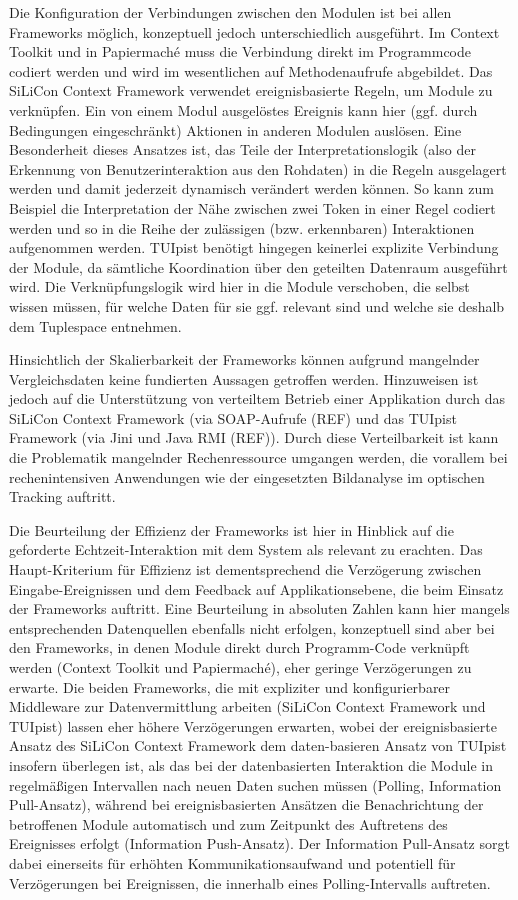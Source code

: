 Die Konfiguration der Verbindungen zwischen den Modulen ist bei allen Frameworks möglich, konzeptuell jedoch unterschiedlich ausgeführt. Im Context Toolkit und in Papiermaché muss die Verbindung direkt im Programmcode codiert werden und wird im wesentlichen auf Methodenaufrufe abgebildet. Das SiLiCon Context Framework verwendet ereignisbasierte Regeln, um Module zu verknüpfen. Ein von einem Modul ausgelöstes Ereignis kann hier (ggf. durch Bedingungen eingeschränkt) Aktionen in anderen Modulen auslösen. Eine Besonderheit dieses Ansatzes ist, das Teile der Interpretationslogik (also der Erkennung von Benutzerinteraktion aus den Rohdaten) in die Regeln ausgelagert werden und damit jederzeit dynamisch verändert werden können. So kann zum Beispiel die Interpretation der Nähe zwischen zwei Token in einer Regel codiert werden und so in die Reihe der zulässigen (bzw. erkennbaren) Interaktionen aufgenommen werden. TUIpist benötigt hingegen keinerlei explizite Verbindung der Module, da sämtliche Koordination über den geteilten Datenraum ausgeführt wird. Die Verknüpfungslogik wird hier in die Module verschoben, die selbst wissen müssen, für welche Daten für sie ggf. relevant sind und welche sie deshalb dem Tuplespace entnehmen.

Hinsichtlich der Skalierbarkeit der Frameworks können aufgrund mangelnder Vergleichsdaten keine fundierten Aussagen getroffen werden. Hinzuweisen ist jedoch auf die Unterstützung von verteiltem Betrieb einer Applikation durch das SiLiCon Context Framework (via SOAP-Aufrufe (REF) und das TUIpist Framework (via Jini und Java RMI (REF)). Durch diese Verteilbarkeit ist kann die Problematik mangelnder Rechenressource umgangen werden, die vorallem bei rechenintensiven Anwendungen wie der eingesetzten Bildanalyse im optischen Tracking auftritt.

Die Beurteilung der Effizienz der Frameworks ist hier in Hinblick auf die geforderte Echtzeit-Interaktion mit dem System als relevant zu erachten. Das Haupt-Kriterium für Effizienz ist dementsprechend die Verzögerung zwischen Eingabe-Ereignissen und dem Feedback auf Applikationsebene, die beim Einsatz der Frameworks auftritt. Eine Beurteilung in absoluten Zahlen kann hier mangels entsprechenden Datenquellen ebenfalls nicht erfolgen, konzeptuell sind aber bei den Frameworks, in denen Module direkt durch Programm-Code verknüpft werden (Context Toolkit und Papiermaché), eher geringe Verzögerungen zu erwarte. Die beiden Frameworks, die mit expliziter und konfigurierbarer Middleware zur Datenvermittlung arbeiten (SiLiCon Context Framework und TUIpist) lassen eher höhere Verzögerungen erwarten, wobei der ereignisbasierte Ansatz des SiLiCon Context Framework dem daten-basieren Ansatz von TUIpist insofern überlegen ist, als das bei der datenbasierten Interaktion die Module in regelmäßigen Intervallen nach neuen Daten suchen müssen (Polling, Information Pull-Ansatz), während bei ereignisbasierten Ansätzen die Benachrichtung der betroffenen Module automatisch und zum Zeitpunkt des Auftretens des Ereignisses erfolgt (Information Push-Ansatz). Der Information Pull-Ansatz sorgt dabei einerseits für erhöhten Kommunikationsaufwand und potentiell für Verzögerungen bei Ereignissen, die innerhalb eines Polling-Intervalls auftreten.

